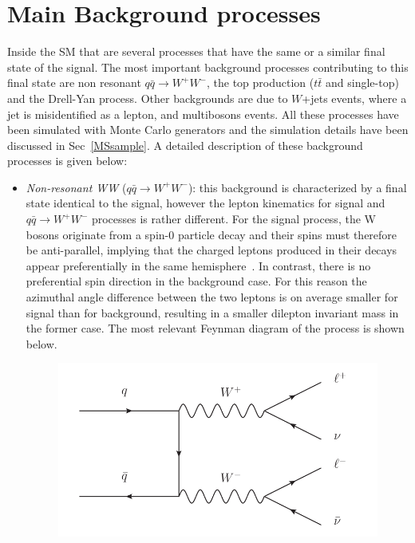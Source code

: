 \section{Main Background processes}
\label{anbkg}
Inside the SM that are several processes that have the same or a similar final state of the signal. The most important background processes contributing to this final state are non resonant $q\bar{q} \to W^+ W^-$, the top production ($t\bar{t}$ and single-top) and the Drell-Yan process. 
Other backgrounds are due to $W$+jets events, where a jet is misidentified as a lepton, and multibosons events. 
All these processes have been simulated with Monte Carlo generators and the simulation details have been discussed in Sec~\ref{MSsample}.
A detailed description of these background processes is given below:
\begin{itemize}
\item \textit{Non-resonant WW} ($q\bar{q} \to W^+ W^-$): this background is characterized by a final state identical to the signal, however the lepton kinematics for signal and $q\bar{q} \to W^+ W^-$ processes is rather different.
For the signal process, the W bosons originate from a spin-0 particle decay
and their spins must therefore be anti-parallel, implying that the charged leptons produced 
in their decays appear preferentially in the same hemisphere~\cite{Ellis:2012wg}. In contrast,
there is no preferential spin direction in the background case. For this reason the
azimuthal angle difference between the two leptons is on average smaller for signal
than for background, resulting in a smaller dilepton invariant mass in the former case. The most relevant Feynman diagram of the process is shown below.
\begin{figure}[h]
\centering
\vspace{0.5cm}
\includegraphics[scale= 0.9]{../Cap5/nnr_WW}
\end{figure}

\end{itemize}
